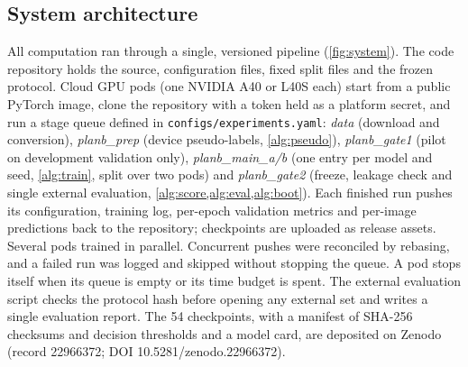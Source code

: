\documentclass{ieeeaccess}
\begin{document}
\subsection{System architecture}
\label{sec:system}
All computation ran through a single, versioned pipeline (\cref{fig:system}). The code repository holds the source, configuration files, fixed split files and the frozen protocol. Cloud GPU pods (one NVIDIA A40 or L40S each) start from a public PyTorch image, clone the repository with a token held as a platform secret, and run a stage queue defined in \texttt{configs/experiments.yaml}: \emph{data} (download and conversion), \emph{planb\_prep} (device pseudo-labels, \cref{alg:pseudo}), \emph{planb\_gate1} (pilot on development validation only), \emph{planb\_main\_a/b} (one entry per model and seed, \cref{alg:train}, split over two pods) and \emph{planb\_gate2} (freeze, leakage check and single external evaluation, \cref{alg:score,alg:eval,alg:boot}). Each finished run pushes its configuration, training log, per-epoch validation metrics and per-image predictions back to the repository; checkpoints are uploaded as release assets. Several pods trained in parallel. Concurrent pushes were reconciled by rebasing, and a failed run was logged and skipped without stopping the queue. A pod stops itself when its queue is empty or its time budget is spent. The external evaluation script checks the protocol hash before opening any external set and writes a single evaluation report. The 54 checkpoints, with a manifest of SHA-256 checksums and decision thresholds and a model card, are deposited on Zenodo (record 22966372; DOI 10.5281/zenodo.22966372).
\end{document}
